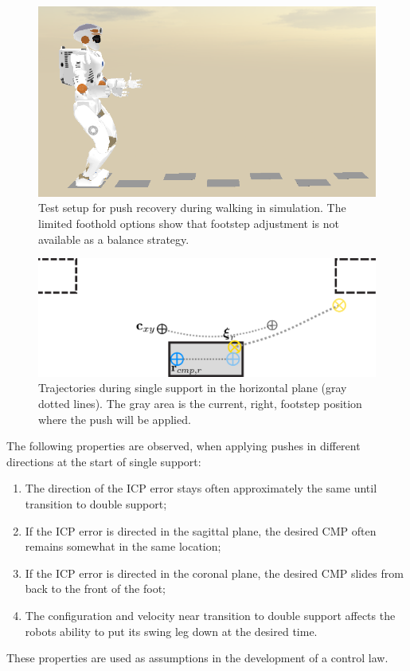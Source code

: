 \begin{figure}[h]
\centering
  \includegraphics[width=.8\linewidth]{STYLESTUFF/valwalkingtest.png}
   \caption{Test setup for push recovery during walking in simulation. The limited foothold options show that footstep adjustment is not available as a balance strategy.}
    \label{fig:valwalkingtest}
\end{figure}
\begin{figure}[h]
\centering
  \includegraphics[width=.8\linewidth]{STYLESTUFF/ICPplan3StepComICPrSS.png}
   \caption{Trajectories during single support in the horizontal plane (gray dotted lines). The gray area is the current, right, footstep position where the push will be applied.}
    \label{fig:3foot}
\end{figure}

The following properties are observed, when applying pushes in different directions at the start of single support:
\begin{enumerate}
	\item The direction of the \ac{ICP} error stays often approximately the same until transition to double support;
	\item If the \ac{ICP} error is directed in the sagittal plane, the desired \ac{CMP} often remains somewhat in the same location;
	\item If the \ac{ICP} error is directed  in the coronal plane, the desired \ac{CMP} slides from back to the front of the foot;
	\item The configuration and velocity near transition to double support affects the robots ability to put its swing leg down at the desired time. 
\end{enumerate}
These properties are used as assumptions in the development of a control law.
